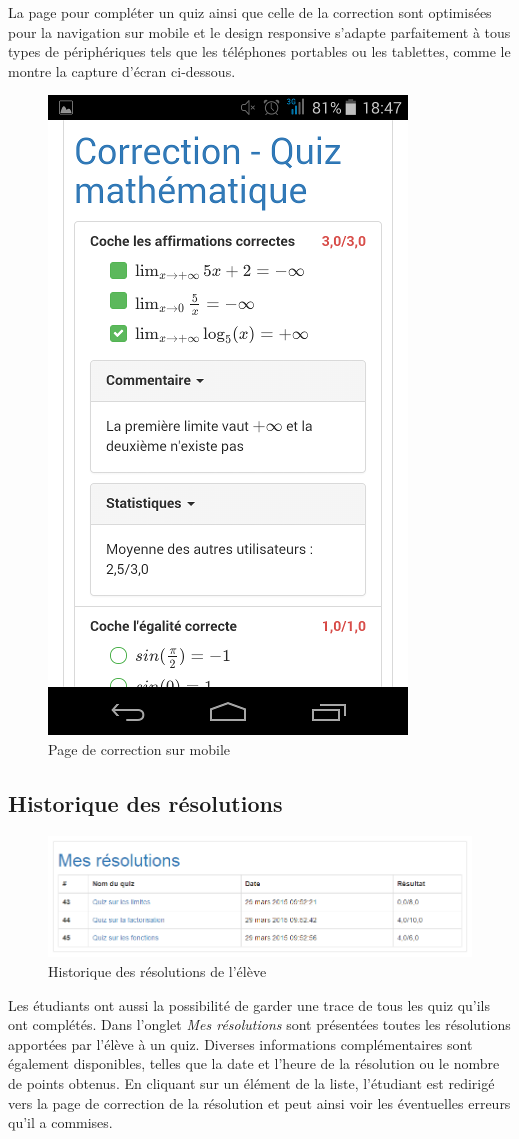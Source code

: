 \documentclass[a4,10pt,french]{sphinxmanual}
\begin{document}
La page pour compléter un quiz ainsi que celle de la correction sont optimisées pour la navigation sur mobile et le design responsive s'adapte parfaitement à tous types de périphériques tels que les téléphones portables ou les tablettes, comme le montre la capture d'écran ci-dessous.
\begin{figure}[htbp]
\centering
\capstart

\includegraphics[width=0.400\linewidth]{mobile-1.png}
\caption{Page de correction sur mobile}\end{figure}


\subsection{Historique des résolutions}
\label{doc-user:historique-des-resolutions}\begin{figure}[htbp]
\centering
\capstart

\includegraphics[width=0.700\linewidth]{completed.png}
\caption{Historique des résolutions de l'élève}\end{figure}

Les étudiants ont aussi la possibilité de garder une trace de tous les quiz qu'ils ont complétés. Dans l'onglet \emph{Mes résolutions} sont présentées toutes les résolutions apportées par l'élève à un quiz. Diverses informations complémentaires sont également disponibles, telles que la date et l'heure de la résolution ou le nombre de points obtenus. En cliquant sur un élément de la liste, l'étudiant est redirigé vers la page de correction de la résolution et peut ainsi voir les éventuelles erreurs qu'il a commises.
\end{document}
